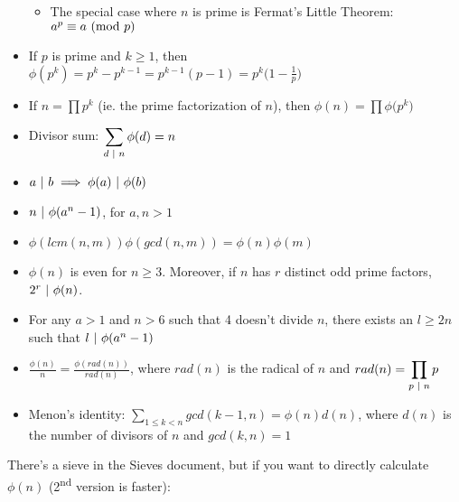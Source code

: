 \begin{itemize}
    \begin{itemize}
        \item The special case where $n$ is prime is Fermat's Little Theorem: $a^p \equiv a \text{ } ( \text{mod } p )$
    \end{itemize}
    \item If $p$ is prime and $k \geq 1$, then
    $\phi (p^k) = p^k - p^{k-1} = p^{k-1} (p - 1) = p^k \big( 1 - \frac{1}{p} \big)$
    \item If ${\displaystyle n = \prod p^k }$ (ie. the prime factorization of $n$), then ${\displaystyle \phi (n) = \prod \phi \big( p^k \big) }$
    \item Divisor sum:
    ${\displaystyle \sum_{d \text{ } | \text{ } n} \phi(d) = n}$
    \item $a \text{ } | \text{ } b \implies \phi(a) \text{ } | \text{ } \phi(b)$
    \item $n \text{ } | \text{ } \phi(a^n - 1)$, for $a, n > 1$
    \item $\phi (lcm(n, m)) \phi( gcd(n, m)) = \phi (n) \phi (m)$
    \item $\phi (n)$ is even for $n \geq 3$. Moreover, if $n$ has $r$ distinct odd prime factors, $2^r \text{ } | \text{ } \phi(n)$.
    \item For any $a > 1$ and $n > 6$ such that 4 doesn't divide $n$, there exists an $l \geq 2n$ such that $l \text{ } | \text{ } \phi (a^n - 1)$
    \item $\frac{\phi (n)}{n} = \frac{\phi (rad(n))}{rad(n)}$, where $rad(n)$ is the radical of $n$ and ${\displaystyle rad(n) = \prod_{p \text{ } | \text{ } n} p}$
    \item Menon's identity: ${\displaystyle \sum_{1 \leq k < n} gcd(k-1, n) = \phi (n) d(n)}$, where $d(n)$ is the number of divisors of $n$ and $gcd(k,n) = 1$
\end{itemize}

There's a sieve in the Sieves document, but if you want to directly calculate $\phi (n)$ (2\textsuperscript{nd} version is faster):





\newpage